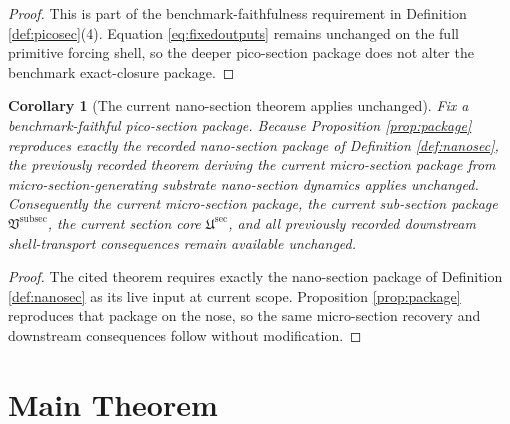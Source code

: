 \documentclass[11pt]{article}
\newcommand{\SubPreSectionCore}{\mathfrak U^{\mathrm{sec}}}
\newcommand{\SubSectionPackage}{\mathfrak V^{\mathrm{subsec}}}
\newtheorem{corollary}{Corollary}
\begin{document}
\begin{proof}
This is part of the benchmark-faithfulness requirement in Definition \ref{def:picosec}(4). Equation \eqref{eq:fixedoutputs} remains unchanged on the full primitive forcing shell, so the deeper pico-section package does not alter the benchmark exact-closure package.
\end{proof}

\begin{corollary}[The current nano-section theorem applies unchanged]
\label{cor:nano}
Fix a benchmark-faithful pico-section package. Because Proposition \ref{prop:package} reproduces exactly the recorded nano-section package of Definition \ref{def:nanosec}, the previously recorded theorem deriving the current micro-section package from micro-section-generating substrate nano-section dynamics applies unchanged. Consequently the current micro-section package, the current sub-section package \(\SubSectionPackage\), the current section core \(\SubPreSectionCore\), and all previously recorded downstream shell-transport consequences remain available unchanged.
\end{corollary}

\begin{proof}
The cited theorem requires exactly the nano-section package of Definition \ref{def:nanosec} as its live input at current scope. Proposition \ref{prop:package} reproduces that package on the nose, so the same micro-section recovery and downstream consequences follow without modification.
\end{proof}

\section{Main Theorem}
\end{document}
